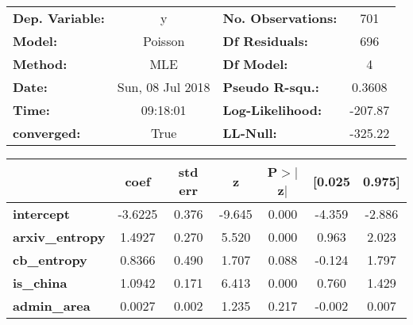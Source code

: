 \documentclass{report}
\begin{document}
\begin{center}
\begin{tabular}{lclc}
\toprule
\textbf{Dep. Variable:} &        y         & \textbf{  No. Observations:  } &      701    \\
\textbf{Model:}         &     Poisson      & \textbf{  Df Residuals:      } &      696    \\
\textbf{Method:}        &       MLE        & \textbf{  Df Model:          } &        4    \\
\textbf{Date:}          & Sun, 08 Jul 2018 & \textbf{  Pseudo R-squ.:     } &   0.3608    \\
\textbf{Time:}          &     09:18:01     & \textbf{  Log-Likelihood:    } &   -207.87   \\
\textbf{converged:}     &       True       & \textbf{  LL-Null:           } &   -325.22   \\
\bottomrule
\end{tabular}
\begin{tabular}{lcccccc}
                        & \textbf{coef} & \textbf{std err} & \textbf{z} & \textbf{P$>$$|$z$|$} & \textbf{[0.025} & \textbf{0.975]}  \\
\midrule
\textbf{intercept}      &      -3.6225  &        0.376     &    -9.645  &         0.000        &       -4.359    &       -2.886     \\
\textbf{arxiv\_entropy} &       1.4927  &        0.270     &     5.520  &         0.000        &        0.963    &        2.023     \\
\textbf{cb\_entropy}    &       0.8366  &        0.490     &     1.707  &         0.088        &       -0.124    &        1.797     \\
\textbf{is\_china}      &       1.0942  &        0.171     &     6.413  &         0.000        &        0.760    &        1.429     \\
\textbf{admin\_area}    &       0.0027  &        0.002     &     1.235  &         0.217        &       -0.002    &        0.007     \\
\bottomrule
\end{tabular}
\end{center}
\end{document}
